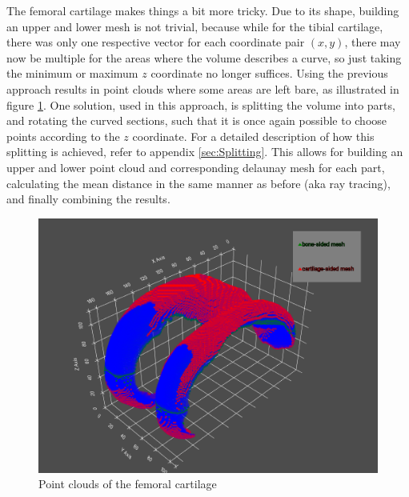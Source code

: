 \par
The femoral cartilage makes things a bit more tricky. Due to its shape, building an upper and lower mesh is not trivial, because while for the tibial cartilage, there was only one respective vector for each coordinate pair $(x, y)$, there may now be multiple for the areas where the volume describes a curve, so just taking the minimum or maximum $z$ coordinate no longer suffices. Using the previous approach results in point clouds where some areas are left bare, as illustrated in figure \ref{fig:femoral_point_cloud}. One solution, used in this approach, is splitting the volume into parts, and rotating the curved sections, such that it is once again possible to choose points according to the $z$ coordinate. For a detailed description of how this splitting is achieved, refer to appendix \ref{sec:Splitting}. This allows for building an upper and lower point cloud and corresponding delaunay mesh for each part, calculating the mean distance in the same manner as before (aka ray tracing), and finally combining the results.
\begin{figure}[htb!]
	\centering
	\includegraphics[width=\linewidth]{./figures/femoral_points}
	\caption{Point clouds of the femoral cartilage}
	\label{fig:femoral_point_cloud}
\end{figure}

